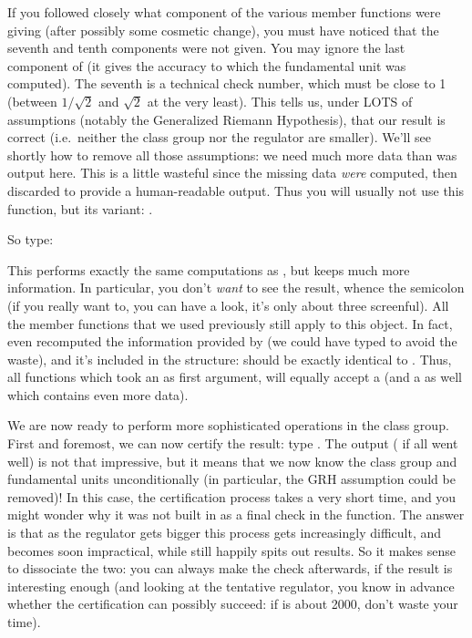 If you followed closely what component of  the various member
functions were giving (after possibly some cosmetic change), you must have
noticed that the seventh and tenth components were not given. You may ignore
the last component of  (it gives the accuracy to which the fundamental
unit was computed).  The seventh is a technical check number, which must be
close to 1 (between $1/\sqrt2$ and $\sqrt2$ at the very least). This tells
us, under LOTS of assumptions (notably the Generalized Riemann Hypothesis),
that our result is correct (i.e.~neither the class group nor the regulator are
smaller). We'll see shortly how to remove all those assumptions: we need much
more data than was output here. This is a little wasteful since the missing
data {\it were} computed, then discarded to provide a human-readable output.
Thus you will usually not use this function, but its  variant:
.
\smallskip

So type: 

This performs exactly the same computations as , but keeps
much more information. In particular, you don't {\it want} to see the result,
whence the semicolon (if you really want to, you can have a look, it's only
about three screenful). All the member functions that we used previously
still apply to this  object. In fact,  even recomputed
the information provided by  (we could have typed
 to avoid the waste), and it's included in the 
structure:  should be exactly identical to . Thus, all
functions which took an  as first argument, will equally accept a
 (and a  as well which contains even more data).

We are now ready to perform more sophisticated operations in the class group.
First and foremost, we can now certify the result: type
. The output ( if all went well) is not that
impressive, but it means that we now know the class group and fundamental
units unconditionally (in particular, the GRH assumption could be removed)!
In this case, the certification process takes a very short time, and you
might wonder why it was not built in as a final check in the 
function. The answer is that as the regulator gets bigger this process gets
increasingly difficult, and becomes soon impractical, while 
still happily spits out results. So it makes sense to dissociate the two: you
can always make the check afterwards, if the result is interesting enough
(and looking at the tentative regulator, you know in advance whether the
certification can possibly succeed: if  is about 2000, don't
waste your time).

